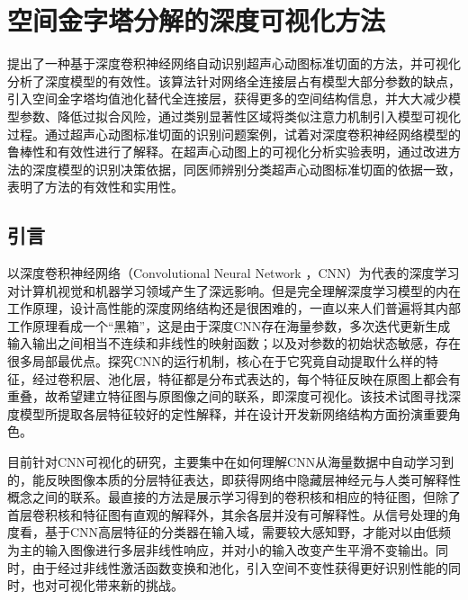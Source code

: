 \chapter{空间金字塔分解的深度可视化方法}
\label{chap:visualization}

 提出了一种基于深度卷积神经网络自动识别超声心动图标准切面的方法，并可视化分析了深度模型的有效性。该算法针对网络全连接层占有模型大部分参数的缺点，引入空间金字塔均值池化替代全连接层，获得更多的空间结构信息，并大大减少模型参数、降低过拟合风险，通过类别显著性区域将类似注意力机制引入模型可视化过程。通过超声心动图标准切面的识别问题案例，试着对深度卷积神经网络模型的鲁棒性和有效性进行了解释。在超声心动图上的可视化分析实验表明，通过改进方法的深度模型的识别决策依据，同医师辨别分类超声心动图标准切面的依据一致，表明了方法的有效性和实用性。

\section{引言}

以深度卷积神经网络（Convolutional Neural Network ，CNN）为代表的深度学习对计算机视觉和机器学习领域产生了深远影响。但是完全理解深度学习模型的内在工作原理，设计高性能的深度网络结构还是很困难的，一直以来人们普遍将其内部工作原理看成一个“黑箱”，这是由于深度CNN存在海量参数，多次迭代更新生成输入输出之间相当不连续和非线性的映射函数；以及对参数的初始状态敏感，存在很多局部最优点。探究CNN的运行机制，核心在于它究竟自动提取什么样的特征，经过卷积层、池化层，特征都是分布式表达的，每个特征反映在原图上都会有重叠，故希望建立特征图与原图像之间的联系，即深度可视化。该技术试图寻找深度模型所提取各层特征较好的定性解释，并在设计开发新网络结构方面扮演重要角色。


目前针对CNN可视化的研究，主要集中在如何理解CNN从海量数据中自动学习到的，能反映图像本质的分层特征表达，即获得网络中隐藏层神经元与人类可解释性概念之间的联系。最直接的方法是展示学习得到的卷积核和相应的特征图，但除了首层卷积核和特征图有直观的解释外，其余各层并没有可解释性。从信号处理的角度看，基于CNN高层特征的分类器在输入域，需要较大感知野，才能对以由低频为主的输入图像进行多层非线性响应，并对小的输入改变产生平滑不变输出。同时，由于经过非线性激活函数变换和池化，引入空间不变性获得更好识别性能的同时，也对可视化带来新的挑战。


